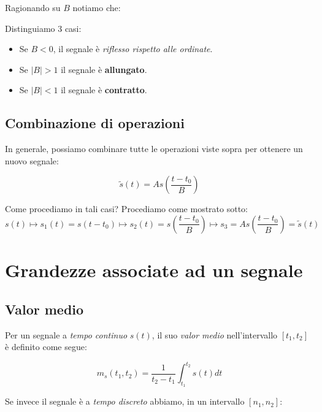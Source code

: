 Ragionando su $B$ notiamo che:

\begin{remark}
    Distinguiamo 3 casi:
    \begin{itemize}
        \item Se $B<0$, il segnale è \textit{riflesso rispetto alle ordinate}.
        \item Se $|B|>1$ il segnale è \textbf{allungato}.
        \item Se $|B|<1$ il segnale è \textbf{contratto}.
    \end{itemize}
\end{remark}

\subsection{Combinazione di operazioni}

In generale, possiamo combinare tutte le operazioni viste sopra
per ottenere un nuovo segnale:

\begin{definition}
    \[
        \tilde{s}(t) = As \left( \frac{t-t_{0}}{B} \right)
    \] 
\end{definition}

Come procediamo in tali casi? Procediamo come mostrato sotto:
\[
    s(t) \mapsto s_{1}(t) = s(t-t_{0}) \mapsto s_{2}(t) = s\left( \frac{t-t_{0}}{B} \right) 
    \mapsto s_{3} = As\left( \frac{t-t_{0}}{B} \right) = \tilde{s}(t)
\]


\section{Grandezze associate ad un segnale}

\subsection{Valor medio}

Per un segnale a \textit{tempo continuo} $s(t)$, il suo \textit{valor medio} nell'intervallo
$[t_{1},t_{2}]$ è definito come segue:

\begin{definition}
    \[
        m_s(t_{1},t_{2}) = \frac{1}{t_{2}-t_{1}} \int_{t_{1}}^{t_{2}} s(t)dt
    \] 
\end{definition}

Se invece il segnale è a \textit{tempo discreto} abbiamo, in
un intervallo $[n_{1},n_{2}]$:


